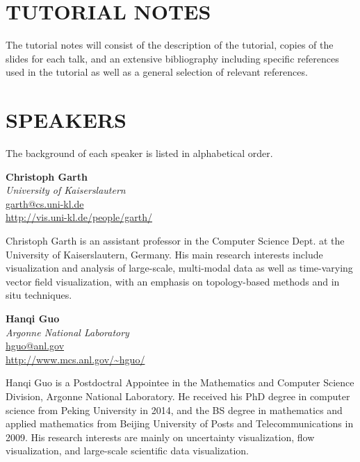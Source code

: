 \documentclass[preprint,journal]{vgtc}       %
\newcommand{\addverticalspace}{\vspace{3mm}}
\begin{document}
\section*{TUTORIAL NOTES}
The tutorial notes will consist of the description of the tutorial, copies of the slides for each talk, and an extensive bibliography including specific references used in the tutorial as well as a general selection of relevant references.

\section*{SPEAKERS}
The background of each speaker is listed in alphabetical order.

\addverticalspace

\noindent \textbf{Christoph Garth}\\
\emph{University of Kaiserslautern}\\
\href{mailto:garth@cs.uni-kl.de}{garth@cs.uni-kl.de}\\
\url{http://vis.uni-kl.de/people/garth/}

\addverticalspace

Christoph Garth is an assistant professor in the Computer Science Dept. at the University of Kaiserslautern, Germany. His main research interests include visualization and analysis of large-scale, multi-modal data as well as time-varying vector field visualization, with an emphasis on topology-based methods and in situ techniques.

\printbibliography[title={Relevant Publications},category=Garth]

\noindent \textbf{Hanqi Guo}\\
\emph{Argonne National Laboratory}\\
\href{mailto:hguo@anl.gov}{hguo@anl.gov}\\
\url{http://www.mcs.anl.gov/~hguo/}

\addverticalspace

Hanqi Guo is a Postdoctral Appointee in the Mathematics and Computer Science Division, Argonne National Laboratory. He received his PhD degree in computer science from Peking University in 2014, and the BS degree in mathematics and applied mathematics from Beijing University of Posts and Telecommunications in 2009. His research interests are mainly on uncertainty visualization, flow visualization, and large-scale scientific data visualization.

\printbibliography[title={Relevant Publications},category=Guo]
\end{document}
